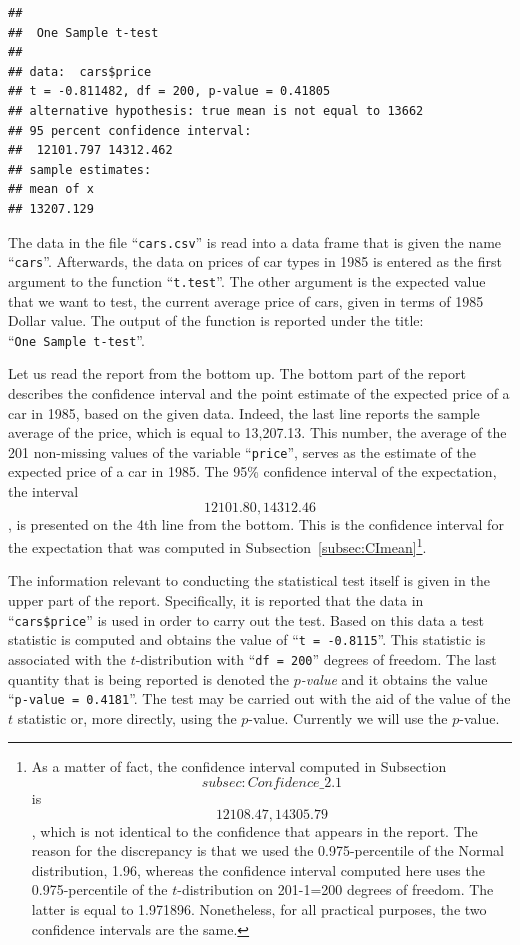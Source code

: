 \documentclass[]{krantz}
\theoremstyle{definition}
\theoremstyle{definition}
\theoremstyle{definition}
\theoremstyle{remark}
\begin{document}
\begin{verbatim}
## 
##  One Sample t-test
## 
## data:  cars$price
## t = -0.811482, df = 200, p-value = 0.41805
## alternative hypothesis: true mean is not equal to 13662
## 95 percent confidence interval:
##  12101.797 14312.462
## sample estimates:
## mean of x 
## 13207.129
\end{verbatim}

The data in the file ``\texttt{cars.csv}'' is read into a data frame
that is given the name ``\texttt{cars}''. Afterwards, the data on prices
of car types in 1985 is entered as the first argument to the function
``\texttt{t.test}''. The other argument is the expected value that we
want to test, the current average price of cars, given in terms of 1985
Dollar value. The output of the function is reported under the title:
``\texttt{One\ Sample\ t-test}''.

Let us read the report from the bottom up. The bottom part of the report
describes the confidence interval and the point estimate of the expected
price of a car in 1985, based on the given data. Indeed, the last line
reports the sample average of the price, which is equal to 13,207.13.
This number, the average of the 201 non-missing values of the variable
``\texttt{price}'', serves as the estimate of the expected price of a
car in 1985. The 95\% confidence interval of the expectation, the
interval \[12101.80, 14312.46\], is presented on the 4th line from the
bottom. This is the confidence interval for the expectation that was
computed in Subsection~\ref{subsec:CImean}\footnote{As a matter of fact,
  the confidence interval computed in
  Subsection~\[subsec:Confidence\_2.1\] is \[12108.47, 14305.79\], which
  is not identical to the confidence that appears in the report. The
  reason for the discrepancy is that we used the 0.975-percentile of the
  Normal distribution, 1.96, whereas the confidence interval computed
  here uses the 0.975-percentile of the \(t\)-distribution on 201-1=200
  degrees of freedom. The latter is equal to 1.971896. Nonetheless, for
  all practical purposes, the two confidence intervals are the same.}.

The information relevant to conducting the statistical test itself is
given in the upper part of the report. Specifically, it is reported that
the data in ``\texttt{cars\$price}'' is used in order to carry out the
test. Based on this data a test statistic is computed and obtains the
value of ``\texttt{t\ =\ -0.8115}''. This statistic is associated with
the \(t\)-distribution with ``\texttt{df\ =\ 200}'' degrees of freedom.
The last quantity that is being reported is denoted the
\emph{\(p\)-value} and it obtains the value
``\texttt{p-value\ =\ 0.4181}''. The test may be carried out with the
aid of the value of the \(t\) statistic or, more directly, using the
\(p\)-value. Currently we will use the \(p\)-value.
\end{document}
